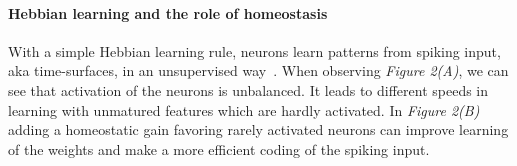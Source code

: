 \documentclass[12pt]{article}
\newcommand{\citep}[1]{\parencite{#1}}
\begin{document}
\paragraph*{Hebbian learning and the role of homeostasis}
With a simple Hebbian learning rule, neurons learn patterns from spiking input, aka time-surfaces, in an unsupervised way~\citep{Lagorce17}.
When observing \textit{Figure 2(A)}, we can see that activation of the neurons is unbalanced. It leads to different speeds in learning with unmatured features which are hardly activated.
In \textit{Figure 2(B)} adding a homeostatic gain favoring rarely activated neurons can improve learning of the weights and make a more efficient coding of the spiking input.
%
\end{document}
